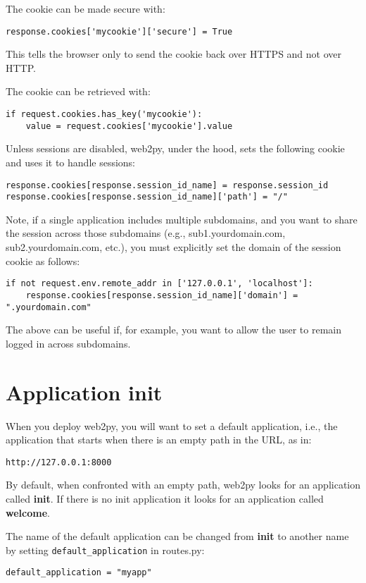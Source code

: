 \documentclass[justified,sixbynine,notoc]{tufte-book}
\def\ft{\small\tt}
\def\inxx#1{\index{#1}}
\begin{document}
\begin{fullwidth}
The cookie can be made secure with:
\begin{lstlisting}
response.cookies['mycookie']['secure'] = True
\end{lstlisting}

This tells the browser only to send the cookie back over HTTPS and not over HTTP.

The cookie can be retrieved with:
\begin{lstlisting}
if request.cookies.has_key('mycookie'):
    value = request.cookies['mycookie'].value
\end{lstlisting}

Unless sessions are disabled, web2py, under the hood, sets the following cookie and uses it to handle sessions:
\begin{lstlisting}
response.cookies[response.session_id_name] = response.session_id
response.cookies[response.session_id_name]['path'] = "/"
\end{lstlisting}

Note, if a single application includes multiple subdomains, and you want to share the session across those subdomains (e.g., sub1.yourdomain.com, sub2.yourdomain.com, etc.), you must explicitly set the domain of the session cookie as follows:
\begin{lstlisting}
if not request.env.remote_addr in ['127.0.0.1', 'localhost']:
    response.cookies[response.session_id_name]['domain'] = ".yourdomain.com"
\end{lstlisting}

The above can be useful if, for example, you want to allow the user to remain logged in across subdomains.

\goodbreak\section{Application {\bf init}}

\inxx{init}

When you deploy web2py, you will want to set a default application, i.e., the application that starts when there is an empty path in the URL, as in:
\begin{lstlisting}[keywords={}]
http://127.0.0.1:8000
\end{lstlisting}

By default, when confronted with an empty path, web2py looks for an application called {\bf init}. If there is no init application it looks for an application called {\bf welcome}.

\inxx{default\_application}
The name of the default application can be changed from {\bf init} to another name by setting {\ft default\_application} in routes.py:
\begin{lstlisting}
default_application = "myapp"
\end{lstlisting}


\end{fullwidth}
\end{document}
